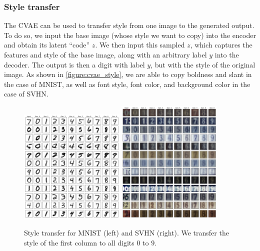 \documentclass[10pt]{article}
\begin{document}
\subsubsection{Style transfer}
The CVAE can be used to transfer style from one image to the generated output. To do so, we input the base image (whose style we want to copy) into the encoder and obtain its latent ``code'' $z$. We then input this sampled $z$, which captures the features and style of the base image, along with an arbitrary label $y$ into the decoder. The output is then a digit with label $y$, but with the style of the original image. As shown in \autoref{figure:cvae_style}, we are able to copy boldness and slant in the case of MNIST, as well as font style, font color, and background color in the case of SVHN.
\begin{figure}[!ht]
\centering
\includegraphics[width=0.45\textwidth]{images/style.png}
\includegraphics[width=0.45\textwidth]{images/svhn_cvae_fc_style.png}
\caption{Style transfer for MNIST (left) and SVHN (right). We transfer the style of the first column to all digits $0$ to $9$.}
\label{figure:cvae_style}
\end{figure}
\end{document}
